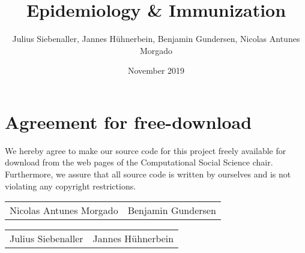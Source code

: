 \documentclass[11pt]{article}
\title{Epidemiology \& Immunization}
\author{Julius Siebenaller, Jannes Hühnerbein, Benjamin Gundersen, Nicolas Antunes Morgado}
\date{November 2019}
\begin{document}


\newpage

\newpage
\section*{Agreement for free-download}
\bigskip
\bigskip

\large We hereby agree to make our source code for this project freely available for download from the web pages of the Computational Social Science chair. Furthermore, we assure that all source code is written by ourselves and is not violating any copyright restrictions.

\begin{center}
\bigskip
\bigskip
\bigskip
\bigskip

\begin{tabular}{@{}p{8cm}@{}@{}p{8cm}@{}}

\begin{minipage}{8cm}
\large Nicolas Antunes Morgado
\end{minipage}

&
\begin{minipage}{8cm}
\large Benjamin Gundersen
\end{minipage}

\end{tabular}


\vspace{3\baselineskip}

\begin{tabular}{@{}p{8cm}@{}@{}p{8cm}@{}}

\begin{minipage}{8cm}
\large Julius Siebenaller
\end{minipage}
&
\begin{minipage}{8cm}
\large Jannes Hühnerbein
\end{minipage}
\end{tabular}

\end{center}


\newpage




\end{document}
